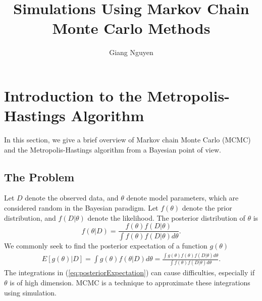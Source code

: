 \documentclass[12pt,openany]{article}
\newcommand{\highlight}[1]{\colorbox{yellow}{#1}}
\theoremstyle{remark} %
\theoremstyle{definition} %
\begin{document}
  
\setcounter{page}{1}
\title{Simulations Using Markov Chain Monte Carlo Methods}
\author{Giang Nguyen}
\maketitle
{}
\newpage
\tableofcontents
\newpage
\listoffigures
\newpage




\section{Introduction to the Metropolis-Hastings Algorithm}
In this section, we give a brief overview of Markov chain Monte Carlo (MCMC) and the Metropolis-Hastings algorithm from a Bayesian point of view. 

\subsection{The Problem}

Let $D$ denote the observed data, and $\theta$ denote model parameters, which are considered random in the Bayesian paradigm. Let $f(\theta)$ denote the prior distribution, and $f(D|\theta)$ denote the likelihood. The posterior distribution of $\theta$ is 
\[ f(\theta|D) = \frac{f(\theta)f(D|\theta)}{\int f(\theta)f(D|\theta)d\theta}.
\]
We commonly seek to find the posterior expectation of a function $g(\theta)$ 
\begin{align} \label{eq:posteriorExpectation}
E[g(\theta)|D] = \int g(\theta) f(\theta | D)d\theta
				= \frac{\int g(\theta) f(\theta) f(D|\theta)d\theta}{\int f(\theta)f(D|\theta)d\theta}.
\end{align}
The integrations in  (\ref{eq:posteriorExpectation}) can cause difficulties, especially if $\theta$ is of high dimension. MCMC is a technique to approximate these integrations using simulation. 
\end{document}
